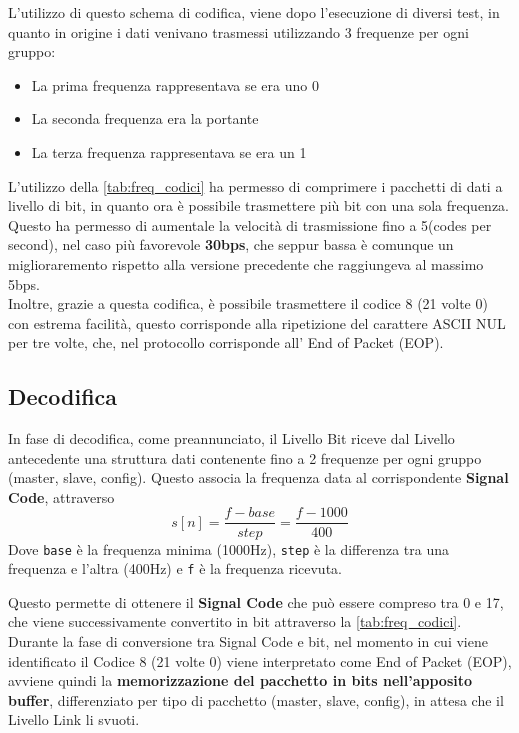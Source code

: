 L'utilizzo di questo schema di codifica, viene dopo l'esecuzione di diversi test, in quanto in origine i dati venivano trasmessi utilizzando 3 frequenze per ogni gruppo:
\begin{itemize}
\item La prima frequenza rappresentava se era uno 0
\item La seconda frequenza era la portante
\item La terza frequenza rappresentava se era un 1
\end{itemize}
L'utilizzo della \autoref{tab:freq_codici} ha permesso di comprimere i pacchetti di dati a livello di bit, in quanto ora è possibile trasmettere più bit con una sola frequenza.\\
Questo ha permesso di aumentale la velocità di trasmissione fino a 5(codes per second), nel caso più favorevole \textbf{30bps}, 
che seppur bassa è comunque un miglioraremento rispetto alla versione precedente che raggiungeva al massimo 5bps.\\
Inoltre, grazie a questa codifica, è possibile trasmettere il codice 8 (21 volte 0) 
con estrema facilità, questo corrisponde alla ripetizione del carattere ASCII NUL per tre volte, che, nel protocollo corrisponde all' End of Packet (EOP).\\

\subsection{Decodifica}
In fase di decodifica, come preannunciato, il Livello Bit riceve dal Livello antecedente una struttura dati contenente fino a 2 frequenze per ogni gruppo (master, slave, config).
Questo associa la frequenza data al corrispondente \textbf{Signal Code}, attraverso
\begin{equation}
s[n] = \frac{f-base}{step} = \frac{f-1000}{400}
\end{equation}
Dove \texttt{base} è la frequenza minima (1000Hz), \texttt{step} è la differenza tra una frequenza e l'altra (400Hz) e \texttt{f} è la frequenza ricevuta.

Questo permette di ottenere il \textbf{Signal Code} che può essere compreso tra 0 e 17, che viene successivamente convertito in bit attraverso
la \autoref{tab:freq_codici}.\\
Durante la fase di conversione tra Signal Code e bit, nel momento in cui viene identificato il Codice 8 (21 volte 0) viene interpretato come End of Packet (EOP),
avviene quindi la \textbf{memorizzazione del pacchetto in bits nell'apposito buffer}, differenziato per tipo di pacchetto (master, slave, config), 
in attesa che il Livello Link li svuoti.\\

